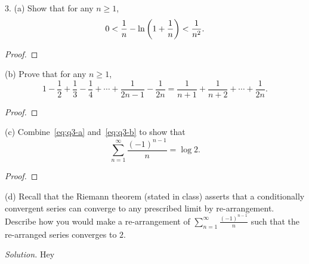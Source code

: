 \documentclass{article}
\begin{document}
\newpage

3. (a) Show that for any $n \geq 1$,
%
\begin{equation}
    0 < \frac{1}{n} - \ln \del{1 + \frac{1}{n}} < \frac{1}{n^2}.
    \label{eq:q3-a}
\end{equation}

\begin{proof}

\end{proof}

(b) Prove that for any $n \geq 1$,
%
\begin{equation}
    1 - \frac{1}{2} + \frac{1}{3} - \frac{1}{4} + \cdots + \frac{1}{2 n - 1} - \frac{1}{2 n}
    = \frac{1}{n + 1} + \frac{1}{n + 2} + \cdots + \frac{1}{2 n}.
    \label{eq:q3-b}
\end{equation}

\begin{proof}

\end{proof}

(c) Combine~\eqref{eq:q3-a} and~\eqref{eq:q3-b} to show that
%
\begin{equation*}
   \sum_{n = 1}^\infty  \frac{(-1)^{n - 1}}{n} = \log 2.
\end{equation*}

\begin{proof}

\end{proof}

(d) Recall that the Riemann theorem (stated in class) asserts that a
conditionally convergent series can converge to any prescribed limit by
re-arrangement. Describe how you would make a re-arrangement of
$\sum_{n=1}^\infty \frac{(-1)^{n - 1}}{n}$ such that the re-arranged
series converges to $2$.

\textit{Solution.}
Hey
\end{document}
